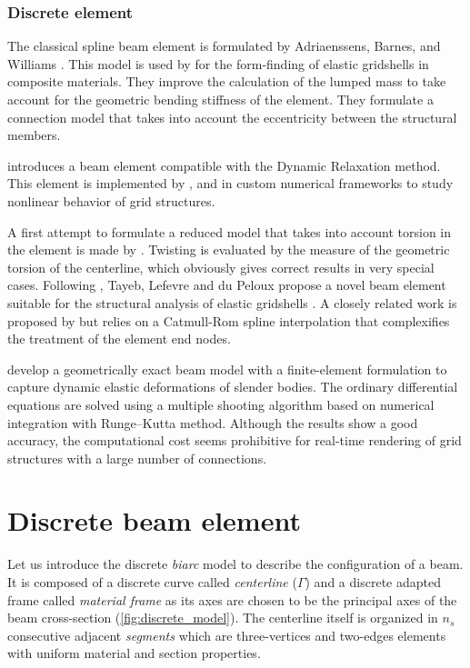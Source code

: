 \subsubsection{Discrete element}

The classical  spline beam element is formulated by Adriaenssens, Barnes, and Williams \cite{Barnes1999,Adriaenssens1999,Adriaenssens2001}. This model is used by  for the form-finding of elastic gridshells in composite materials. They improve the calculation of the lumped mass to take account for the geometric bending stiffness of the element. They formulate a connection model that takes into account the eccentricity between the structural members.

 introduces a  beam element compatible with the Dynamic Relaxation method. This element is implemented by ,  and  in custom numerical frameworks to study nonlinear behavior of grid structures.

A first attempt to formulate a reduced model that takes into account torsion in the element is made by . Twisting is evaluated by the measure of the geometric torsion of the centerline, which obviously gives correct results in very special cases. Following , Tayeb, Lefevre and du Peloux propose a novel  beam element suitable for the structural analysis of elastic gridshells \cite{DuPeloux2015,Lefevre2017}. A closely related work is proposed by  but relies on a Catmull-Rom spline interpolation that complexifies the treatment of the element end nodes.

 develop a geometrically exact beam model with a finite-element formulation to capture dynamic elastic deformations of slender bodies. The ordinary differential equations are solved using a multiple shooting algorithm based on numerical integration with Runge–Kutta method. Although the results show a good accuracy, the computational cost seems prohibitive for real-time rendering of grid structures with a large number of connections.






\section{Discrete beam element}\label{sec=dmodel}
Let us introduce the discrete \emph{biarc} model to describe the configuration of a beam. It is composed of a discrete curve called \emph{centerline} ($\Gamma$) and a discrete adapted frame called \emph{material frame} as its axes are chosen to be the principal axes of the beam cross-section (\cref{fig:discrete_model}). The centerline itself is organized in $n_s$ consecutive adjacent \emph{segments} which are three-vertices and two-edges elements with uniform material and section properties.

